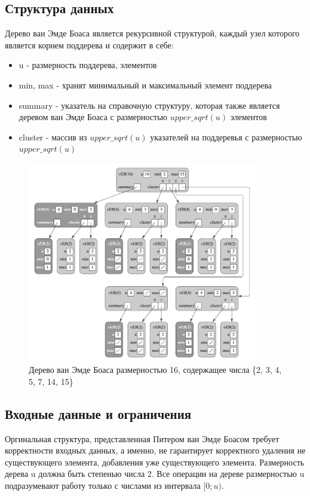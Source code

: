 \documentclass{article}
\begin{document}
\subsection{Структура данных}
Дерево ван Эмде Боаса является рекурсивной структурой, каждый узел которого является корнем поддерева и содержит в себе:
\begin{itemize}
    \item u - размерность поддерева, элементов
    \item min, max - хранят минимальный и максимальный элемент поддерева
    \item summary - указатель на справочную структуру, которая также является деревом ван Эмде Боаса с размерностью $upper\_sqrt(u)$ элементов 
    \item cluster - массив из $upper\_sqrt(u)$ указателей на поддеревья с размерностью $upper\_sqrt(u)$
\end{itemize}

\begin{figure}[H]
    \centering
    \includegraphics[width=0.9\textwidth]{veb.png}
    \caption{Дерево ван Эмде Боаса размерностью 16, содержащее числа \{2, 3, 4, 5, 7, 14, 15\}}
\end{figure}

\subsection{Входные данные и ограничения}
Оргинальная структура, представленная Питером ван Эмде Боасом требует корректности входных данных, а именно, не гарантирует корректного удаления не существующего элемента, добавления уже существующего элемента. Размерность дерева u должна быть степенью числа 2. Все операции на дереве размерностью u подразумевают работу только с числами из интервала $[0;u)$.
\end{document}
